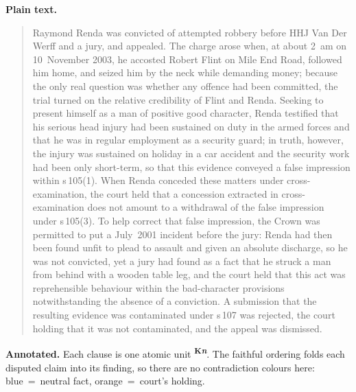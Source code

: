\documentclass[11pt]{article}
\begin{document}
\noindent\textbf{Plain text.}
\begin{quote}
Raymond Renda was convicted of attempted robbery before HHJ Van Der Werff and a
jury, and appealed. The charge arose when, at about 2~am on 10~November 2003, he
accosted Robert Flint on Mile End Road, followed him home, and seized him by the
neck while demanding money; because the only real question was whether any
offence had been committed, the trial turned on the relative credibility of Flint
and Renda. Seeking to present himself as a man of positive good character, Renda
testified that his serious head injury had been sustained on duty in the armed
forces and that he was in regular employment as a security guard; in truth,
however, the injury was sustained on holiday in a car accident and the security
work had been only short-term, so that this evidence conveyed a false impression
within s\,105(1). When Renda conceded these matters under cross-examination, the
court held that a concession extracted in cross-examination does not amount to a
withdrawal of the false impression under s\,105(3). To help correct that false
impression, the Crown was permitted to put a July~2001 incident before the jury:
Renda had then been found unfit to plead to assault and given an absolute
discharge, so he was not convicted, yet a jury had found as a fact that he struck
a man from behind with a wooden table leg, and the court held that this act was
reprehensible behaviour within the bad-character provisions notwithstanding the
absence of a conviction. A submission that the resulting evidence was
contaminated under s\,107 was rejected, the court holding that it was not
contaminated, and the appeal was dismissed.
\end{quote}

\noindent\textbf{Annotated.} Each clause is one atomic unit
\textsuperscript{\textbf{\scriptsize K\textit{n}}}. The faithful ordering folds
each disputed claim into its finding, so there are no contradiction colours here:
blue~=~neutral fact, orange~=~court's holding.
\end{document}
